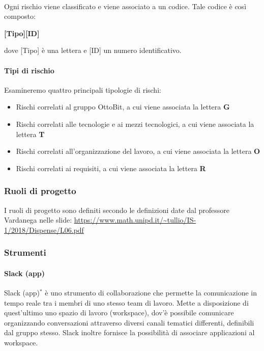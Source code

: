 \documentclass[11pt,a4paper]{article}
\begin{document}
{	
	
	\noindent \\
	Ogni rischio viene classificato e viene associato a un codice. Tale codice è così composto:
	\begin{center}
		\textbf{[Tipo][ID]}
	\end{center}
	dove [Tipo] è una lettera e [ID] un numero identificativo.\\
	
	\paragraph{Tipi di rischio\\}
	Esamineremo quattro principali tipologie di rischi:
	
	\begin{itemize}
		\item Rischi correlati al gruppo OttoBit, a cui viene associata la lettera \textbf{G}
		\item Rischi correlati alle tecnologie e ai mezzi tecnologici, a cui viene associata la lettera \textbf{T}
		\item Rischi correlati all'organizzazione del lavoro, a cui viene associata la lettera \textbf{O}
		\item Rischi correlati ai requisiti, a cui viene associata la lettera \textbf{R}
	\end{itemize}
	
	\subsubsection{Ruoli di progetto}
	I ruoli di progetto sono definiti secondo le definizioni date dal professore Vardanega nelle slide:
	\url{https://www.math.unipd.it/~tullio/IS-1/2018/Dispense/L06.pdf}
	\subsubsection{Strumenti}
	
	\paragraph{Slack (app)\\}
	Slack (app)$^*$ è uno strumento di collaborazione che permette la comunicazione in tempo reale tra i membri di uno stesso team di lavoro. Mette a disposizione di quest’ultimo uno spazio di lavoro (workspace), dov'è possibile comunicare organizzando conversazioni attraverso diversi canali tematici differenti, definibili dal gruppo stesso.
	Slack inoltre fornisce la possibilità di associare applicazioni al workspace.
	
}
\end{document}
